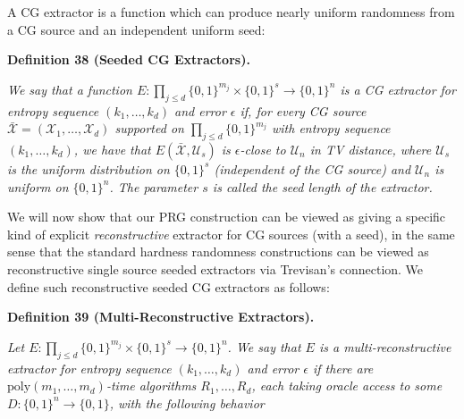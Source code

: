 A CG extractor is a function which can produce nearly uniform randomness from a CG source and an independent uniform seed:\par





\par\medskip\noindent\textbf{
\textbf{Definition 38}\textbf{ }(Seeded CG Extractors)\textbf{.}
}\par



\emph{We say that a function $E:\prod_{j\leq d}\{0,1\}^{m_{j}}\times\{0,1\}^{s}\to\{0,1\}^{n}$ is a CG extractor for entropy sequence $(k_{1},\ldots,k_{d})$ and error $\epsilon$ if, for every CG source $\bar{\mathcal{X}}=(\mathcal{X}_{1},\ldots,\mathcal{X}_{d})$ supported on $\prod_{j\leq d}\{0,1\}^{m_{j}}$ with entropy sequence $(k_{1},\ldots,k_{d})$, we have that $E(\bar{\mathcal{X}},\mathcal{U}_{s})$ is $\epsilon$-close to $\mathcal{U}_{n}$ in TV distance, where $\mathcal{U}_{s}$ is the uniform distribution on $\{0,1\}^{s}$ (independent of the CG source) and $\mathcal{U}_{n}$ is uniform on $\{0,1\}^{n}$. The parameter $s$ is called the seed length of the extractor.}\par






We will now show that our PRG construction can be viewed as giving a specific kind of explicit \emph{reconstructive} extractor for CG sources (with a seed), in the same sense that the standard hardness randomness constructions can be viewed as reconstructive single source seeded extractors via Trevisan’s connection. We define such reconstructive seeded CG extractors as follows:\par





\par\medskip\noindent\textbf{
\textbf{Definition 39}\textbf{ }(Multi-Reconstructive Extractors)\textbf{.}
}\par



\emph{Let $E:\prod_{j\leq d}\{0,1\}^{m_{j}}\times\{0,1\}^{s}\to\{0,1\}^{n}$. We say that $E$ is a multi-reconstructive extractor for entropy sequence $(k_{1},\ldots,k_{d})$ and error $\epsilon$ if there are $\mathrm{poly}(m_{1},\ldots,m_{d})$-time algorithms $R_{1},\ldots,R_{d}$, each taking oracle access to some $D:\{0,1\}^{n}\to\{0,1\}$, with the following behavior}\par


